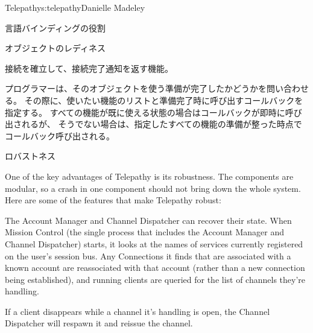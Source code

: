 \begin{aosachapter}{Telepathy}{s:telepathy}{Danielle Madeley}
\begin{aosasect1}{言語バインディングの役割}
\begin{aosasect2}{オブジェクトのレディネス}
\begin{aosaitemize}
  \item 接続を確立して、接続完了通知を返す機能。

\end{aosaitemize}

プログラマーは、そのオブジェクトを使う準備が完了したかどうかを問い合わせる。
その際に、使いたい機能のリストと準備完了時に呼び出すコールバックを指定する。
すべての機能が既に使える状態の場合はコールバックが即時に呼び出されるが、
そうでない場合は、指定したすべての機能の準備が整った時点でコールバック呼び出される。

\end{aosasect2}

\end{aosasect1}

\begin{aosasect1}{ロバストネス}

One of the key advantages of Telepathy is its robustness. The
components are modular, so a crash in one component should not bring
down the whole system.  Here are some of the features that make
Telepathy robust:

\begin{aosaitemize}

  \item The Account Manager and Channel Dispatcher can recover their
    state.  When Mission Control (the single process that includes the
    Account Manager and Channel Dispatcher) starts, it looks at the
    names of services currently registered on the user's session bus.
    Any Connections it finds that are associated with a known account
    are reassociated with that account (rather than a new connection
    being established), and running clients are queried for the list
    of channels they're handling.

  \item If a client disappears while a channel it's handling is open,
    the Channel Dispatcher will respawn it and reissue the channel.


\end{aosaitemize}
\end{aosasect1}
\end{aosachapter}
